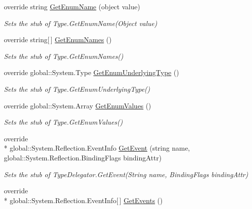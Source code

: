 \begin{DoxyCompactItemize}
override string \hyperlink{class_system_1_1_reflection_1_1_fakes_1_1_stub_type_delegator_a30eccd3ebe97b3df27956380ca9ea1da}{Get\-Enum\-Name} (object value)
\begin{DoxyCompactList}\small\item\em Sets the stub of Type.\-Get\-Enum\-Name(\-Object value)\end{DoxyCompactList}\item 
override string\mbox{[}$\,$\mbox{]} \hyperlink{class_system_1_1_reflection_1_1_fakes_1_1_stub_type_delegator_ac5436ae09ca24edfd3cfc58c72698694}{Get\-Enum\-Names} ()
\begin{DoxyCompactList}\small\item\em Sets the stub of Type.\-Get\-Enum\-Names()\end{DoxyCompactList}\item 
override global\-::\-System.\-Type \hyperlink{class_system_1_1_reflection_1_1_fakes_1_1_stub_type_delegator_ae4643c33466bdd757e7d905bfda821bf}{Get\-Enum\-Underlying\-Type} ()
\begin{DoxyCompactList}\small\item\em Sets the stub of Type.\-Get\-Enum\-Underlying\-Type()\end{DoxyCompactList}\item 
override global\-::\-System.\-Array \hyperlink{class_system_1_1_reflection_1_1_fakes_1_1_stub_type_delegator_a0faed0d8e974a66fb1a28f9d3db4e3b2}{Get\-Enum\-Values} ()
\begin{DoxyCompactList}\small\item\em Sets the stub of Type.\-Get\-Enum\-Values()\end{DoxyCompactList}\item 
override \\*
global\-::\-System.\-Reflection.\-Event\-Info \hyperlink{class_system_1_1_reflection_1_1_fakes_1_1_stub_type_delegator_ad65ce4ea8187201bce7649471f2f6c1d}{Get\-Event} (string name, global\-::\-System.\-Reflection.\-Binding\-Flags binding\-Attr)
\begin{DoxyCompactList}\small\item\em Sets the stub of Type\-Delegator.\-Get\-Event(\-String name, Binding\-Flags binding\-Attr)\end{DoxyCompactList}\item 
override \\*
global\-::\-System.\-Reflection.\-Event\-Info\mbox{[}$\,$\mbox{]} \hyperlink{class_system_1_1_reflection_1_1_fakes_1_1_stub_type_delegator_ab2800f41b5d564cafef167df569ddde6}{Get\-Events} ()

\end{DoxyCompactItemize}
